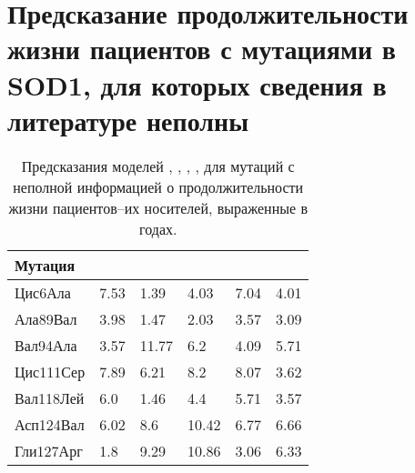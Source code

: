 \section{Предсказание продолжительности жизни пациентов с мутациями в SOD1, для которых сведения в литературе неполны} \label{sect_MD_prediction}

\begin{table} [htbp]%
    \centering
	\caption{Предсказания моделей  \modelpphb{}, \modelpwhb{}, \modelwbr{}, \modelCLS{}, \modelCRF{} для мутаций с неполной информацией о продолжительности жизни пациентов--их носителей, выраженные в годах.}\label{tbl:models_pred}%
    \begin{SingleSpace}
	\begin{tabular}{@{}@{\extracolsep{20pt}}llllll@{}} %
        \toprule     %
	Мутация & \modelpphb{} & \modelpwhb{} & \modelwbr{} & \modelCLS{} & \modelCRF{} \\
        \midrule %
	Цис6Ала	& 7.53 & 1.39 & 4.03 & 7.04 & 4.01 \\
	Ала89Вал	& 3.98 & 1.47 & 2.03 & 3.57 & 3.09 \\
	Вал94Ала	& 3.57 & 11.77 & 6.2 & 4.09 & 5.71 \\
	Цис111Сер	& 7.89 & 6.21 & 8.2 & 8.07 & 3.62 \\
	Вал118Лей	& 6.0 & 1.46 & 4.4 & 5.71 & 3.57 \\
	Асп124Вал	& 6.02 & 8.6 & 10.42 & 6.77 & 6.66 \\
	Гли127Арг	& 1.8 & 9.29 & 10.86 & 3.06 & 6.33 \\
        \bottomrule %
	\end{tabular}%
   	\end{SingleSpace}
\end{table}

